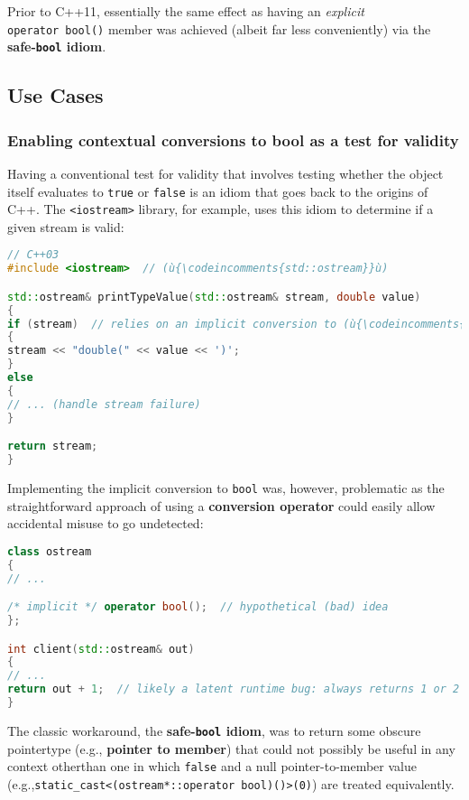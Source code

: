 \noindent Prior to C++11, essentially the same effect as having an \emph{explicit}
\texttt{operator}~\texttt{bool()} member was achieved (albeit far less
conveniently) via the \textbf{safe-\texttt{bool} idiom}.

\subsection[Use Cases]{Use Cases}\label{use-cases-explicitconv}

\subsubsection[Enabling contextual conversions to {\tt bool} as a test for validity]{Enabling contextual conversions to {\SubsubsecCode bool} as a test for validity}\label{enabling-contextual-conversions-to-bool-as-a-test-for-validity}

Having a conventional test for validity that involves testing whether the object itself evaluates to \texttt{true} or \texttt{false} is an idiom that goes back to the
origins of C++. The \texttt{<iostream>} library, for example, uses this
idiom to determine if a given stream is valid:

\begin{lstlisting}[language=C++]
// C++03
#include <iostream>  // (ù{\codeincomments{std::ostream}}ù)

std::ostream& printTypeValue(std::ostream& stream, double value)
{
if (stream)  // relies on an implicit conversion to (ù{\codeincomments{bool}}ù)
{
stream << "double(" << value << ')';
}
else
{
// ... (handle stream failure)
}

return stream;
}
\end{lstlisting}

\noindent Implementing the implicit conversion to \texttt{bool} was, however,
problematic as the straight\-forward approach of using a
\textbf{conversion operator} could easily allow accidental misuse to go
undetected:

\begin{lstlisting}[language=C++]
class ostream
{
// ...

/* implicit */ operator bool();  // hypothetical (bad) idea
};

int client(std::ostream& out)
{
// ...
return out + 1;  // likely a latent runtime bug: always returns 1 or 2
}
\end{lstlisting}

\noindent The classic workaround, the \textbf{safe-\texttt{bool} idiom},
was to return some obscure pointer\linebreak[4] %
type (e.g., \textbf{pointer to
member}) that could not possibly be useful in any context other\linebreak[4] %
than one in which \texttt{false} and a null pointer-to-member value (e.g.,\linebreak[4] %
\texttt{static\_cast<(ostream*::operator}~\texttt{bool)()>(0)}) are
treated equivalently.

